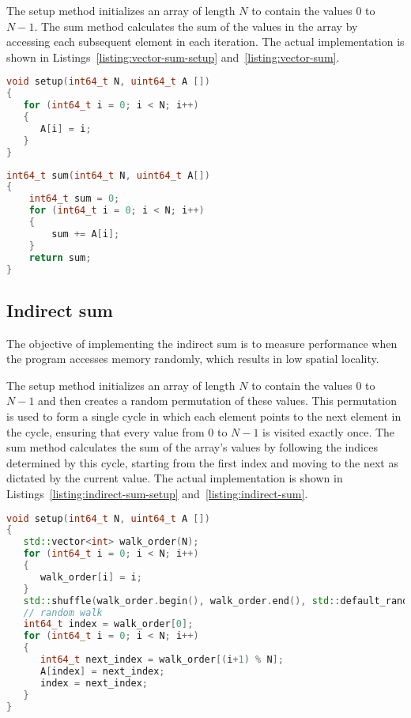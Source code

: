 The setup method initializes an array of length \(N\) to contain the values \(0\) to \(N-1\). The sum method calculates the sum of the values in the array by accessing each subsequent element in each iteration. The actual implementation is shown in Listings~\ref{listing:vector-sum-setup} and~\ref{listing:vector-sum}.


\begin{lstlisting}[caption={Vector Sum Setup: Initializes an array with sequential values from \(0\) to \(N-1\).},label={listing:vector-sum-setup}, name=vector-sum-setup, float=htbp, style=mystyle,language=C++]
void setup(int64_t N, uint64_t A [])
{
   for (int64_t i = 0; i < N; i++)
   {
      A[i] = i;
   }
}
\end{lstlisting}

\begin{lstlisting}[caption={Vector Sum: Calculates the sum by sequentially accessing and adding the elements of the array.},label={listing:vector-sum}, name=vector-sum, float=htbp, style=mystyle,language=C++]
int64_t sum(int64_t N, uint64_t A[])
{
    int64_t sum = 0;
    for (int64_t i = 0; i < N; i++)
    {
        sum += A[i];
    }
    return sum;
}
\end{lstlisting}

\FloatBarrier
\subsection{Indirect sum}
\label{subsec:implementation-indirect-sum}

The objective of implementing the indirect sum is to measure performance when the program accesses memory randomly, which results in low spatial locality.

The setup method initializes an array of length \(N\) to contain the values \(0\) to \(N-1\) and then creates a random permutation of these values. This permutation is used to form a single cycle in which each element points to the next element in the cycle, ensuring that every value from \(0\) to \(N-1\) is visited exactly once. The sum method calculates the sum of the array's values by following the indices determined by this cycle, starting from the first index and moving to the next as dictated by the current value. The actual implementation is shown in Listings~\ref{listing:indirect-sum-setup} and~\ref{listing:indirect-sum}.

\begin{lstlisting}[caption={Indirect Sum Setup: Initializes an array with values \(0\) to \(N-1\) and shuffles them to create a single cycle for indirect access.},label={listing:indirect-sum-setup}, name=indirect-sum-setup, float=htbp, style=mystyle,language=C++]
void setup(int64_t N, uint64_t A [])
{
   std::vector<int> walk_order(N);
   for (int64_t i = 0; i < N; i++)
   {
      walk_order[i] = i;
   }
   std::shuffle(walk_order.begin(), walk_order.end(), std::default_random_engine());
   // random walk
   int64_t index = walk_order[0];
   for (int64_t i = 0; i < N; i++)
   {
      int64_t next_index = walk_order[(i+1) % N];
      A[index] = next_index;
      index = next_index;
   }
}
\end{lstlisting}

